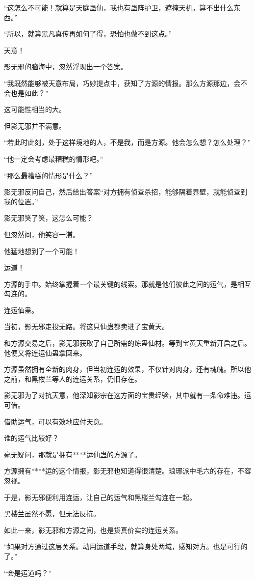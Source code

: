 \begin{this_body}
“这怎么不可能！就算是天庭蛊仙，我也有蛊阵护卫，遮掩天机，算不出什么东西。”

“所以，就算黑凡真传再如何了得，恐怕也做不到这点。”

天意！

影无邪的脑海中，忽然浮现出一个答案。

“我既然能够被天意布局，巧妙提点中，获知了方源的情报。那么方源那边，会不会也是如此？”

这可能性相当的大。

但影无邪并不满意。

“若此时此刻，处于这样境地的人，不是我，而是方源。他会怎么想？怎么处理？”

“他一定会考虑最糟糕的情形吧。”

“那么最糟糕的情形是什么？”

影无邪反问自己，然后给出答案“对方拥有侦查杀招，能够隔着界壁，就能侦查到我的位置。”

影无邪笑了笑，这怎么可能？

但忽然间，他笑容一滞。

他猛地想到了一个可能！

运道！

方源的手中。始终掌握着一个最关键的线索。那就是他们彼此之间的运气，是相互勾连的。

连运仙蛊。

当初，影无邪走投无路。将这只仙蛊都卖进了宝黄天。

和方源交易之后，影无邪获取了自己所需的炼蛊仙材。等到宝黄天重新开启之后。他便又将连运仙蛊拿回来。

方源虽然拥有全新的肉身，但当初连运的效果，不仅针对肉身，还有魂魄。所以他之前，和黑楼兰等人的连运关系，仍旧存在。

影无邪为了对抗天意，他深知影宗在这方面的宝贵经验，其中就有一条命难违。运可借。

借助运气，可以有效地应付天意。

谁的运气比较好？

毫无疑问，那就是拥有****运仙蛊的方源了。

方源拥有****运的这个情报，影无邪也知道得很清楚。琅琊派中毛六的存在，不容忽视。

于是，影无邪便利用连运，让自己的运气和黑楼兰勾连在一起。

黑楼兰虽然不愿，但无法反抗。

如此一来，影无邪和方源之间，也是货真价实的连运关系。

“如果对方通过这层关系。动用运道手段，就算身处两域，感知对方。也是可行的了。”

“会是运道吗？”


\end{this_body}
